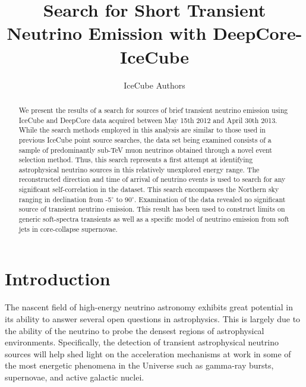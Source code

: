 \documentclass[manuscript]{aastex}
\begin{document}

\title{Search for Short Transient Neutrino Emission with DeepCore-IceCube}
\author{IceCube Authors}

\begin{abstract}
We present the results of a search for sources of brief transient neutrino emission using IceCube and DeepCore data acquired between May 15th 2012 and April 30th 2013. While the search methods employed in this analysis are similar to those used in previous IceCube point source searches, the data set being examined consists of a sample of predominantly sub-TeV muon neutrinos obtained through a novel event selection method. Thus, this search represents a first attempt at identifying astrophysical neutrino sources in this relatively unexplored energy range. The reconstructed direction and time of arrival of neutrino events is used to search for any significant self-correlation in the dataset. This search encompasses the Northern sky ranging in declination from -5$^{\circ}$ to 90$^{\circ}$. Examination of the data revealed no significant source of transient neutrino emission. This result has been used to construct limits on generic soft-spectra transients as well as a specific model of neutrino emission from soft jets in core-collapse supernovae.
\end{abstract}




\section{Introduction}
The nascent field of high-energy neutrino astronomy exhibits great potential in its ability to answer several open questions in astrophysics. This is largely due to the ability of the neutrino to probe the densest regions of astrophysical environments. Specifically, the detection of transient astrophysical neutrino sources will help shed light on the acceleration mechanisms at work in some of the most energetic phenomena in the Universe such as gamma-ray bursts, supernovae, and active galactic nuclei.
\end{document}
